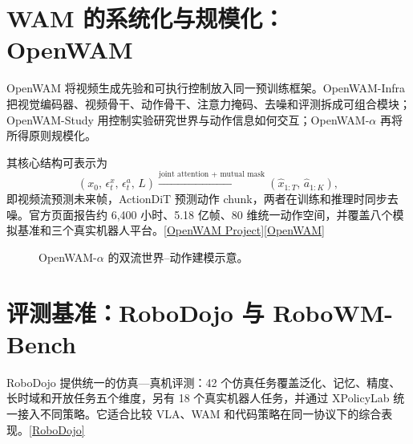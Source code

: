 \documentclass[UTF8,a4paper,11pt]{ctexart}
\begin{document}
\section{WAM 的系统化与规模化：OpenWAM}
OpenWAM 将视频生成先验和可执行控制放入同一预训练框架。OpenWAM-Infra 把视觉编码器、视频骨干、动作骨干、注意力掩码、去噪和评测拆成可组合模块；OpenWAM-Study 用控制实验研究世界与动作信息如何交互；OpenWAM-$\alpha$ 再将所得原则规模化。

其核心结构可表示为
\[
 (x_0,\,\epsilon^x_t,\,\epsilon^a_t,\,L)
 \xrightarrow{\text{joint attention + mutual mask}}
 (\hat{x}_{1:T},\,\hat{a}_{1:K}),
\]
即视频流预测未来帧，ActionDiT 预测动作 chunk，两者在训练和推理时同步去噪。官方页面报告约 6,400 小时、5.18 亿帧、80 维统一动作空间，并覆盖八个模拟基准和三个真实机器人平台。\href{https://openwam-official.github.io/}{[OpenWAM Project]}\;\href{https://arxiv.org/abs/2609.07398}{[OpenWAM]}

\begin{figure}[ht]
\centering
{}
\caption{OpenWAM-$\alpha$ 的双流世界--动作建模示意。}
\end{figure}

\section{评测基准：RoboDojo 与 RoboWM-Bench}
RoboDojo 提供统一的仿真—真机评测：42 个仿真任务覆盖泛化、记忆、精度、长时域和开放任务五个维度，另有 18 个真实机器人任务，并通过 XPolicyLab 统一接入不同策略。它适合比较 VLA、WAM 和代码策略在同一协议下的综合表现。\href{https://arxiv.org/abs/2607.04434}{[RoboDojo]}
\end{document}
